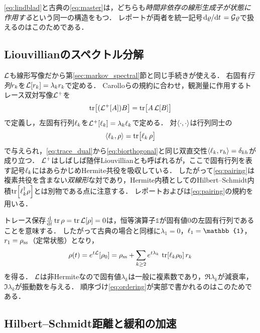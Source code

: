 \documentclass[a4paper,11pt,onecolumn]{jlreq}
\begin{document}
\eqref{eq:lindblad}と古典の\eqref{eq:master}は，どちらも\emph{時間非依存の線形生成子が状態に作用する}という同一の構造をもつ．
レポートが両者を統一記号$\dv*{\varrho}{t}=\mathcal{G}\varrho$で扱えるのはこのためである．

\subsection{Liouvillianのスペクトル分解}
\label{sec:lindblad_spectral}

$\mathcal{L}$も線形写像だから第\ref{sec:markov_spectral}節と同じ手続きが使える．
右固有\emph{行列}$r_{k}$を$\mathcal{L}[r_{k}]=\lambda_kr_{k}$で定める．
Carolloらの規約に合わせ，観測量に作用するトレース双対写像$\mathcal{L}^{+}$を
\begin{equation}
  \tr\!\big[(\mathcal{L}^{+}[A])B\big]
  = \tr\!\big[A\,\mathcal{L}[B]\big]
  \label{eq:trace_dual}
\end{equation}
で定義し，左固有行列$\ell_{k}$を$\mathcal{L}^{+}[\ell_{k}]=\lambda_k\ell_{k}$で定める．
対$\langle \cdot , \cdot \rangle$は行列同士の
\begin{equation}
  \langle \ell_{k} , \rho \rangle = \tr\!\big[\ell_{k}\,\rho\big]
  \label{eq:pairing}
\end{equation}
で与えられ，\eqref{eq:trace_dual}から\eqref{eq:biorthogonal}と同じ双直交性$\langle \ell_{k} , r_{h} \rangle=\delta_{kh}$が成り立つ．
$\mathcal{L}^{+}$はしばしば随伴Liouvillianとも呼ばれるが，ここで固有行列を表す記号$\ell_{k}$にはあらかじめHermite共役を吸収している．
したがって\eqref{eq:pairing}は複素共役を含まない\emph{双線形}な対であり，Hermite内積としてのHilbert--Schmidt内積$\tr[\ell_{k}^{\dagger}\rho]$とは別物である点に注意する．
レポートおよび\cite{Carollo2021}は\eqref{eq:pairing}の規約を用いる．

トレース保存$\dv{t}\tr\rho=\tr\mathcal{L}[\rho]=0$は，恒等演算子$\mathbb{1}$が固有値$0$の左固有行列であることを意味する．
したがって古典の場合と同様に$\lambda_1=0$，$\leig{1}=\mathbb{1}$，$r_{1}=\rho_{\mathrm{ss}}$（定常状態）となり，
\begin{equation}
  \rho(t) = e^{t\mathcal{L}}[\rho_0]
  = \rho_{\mathrm{ss}} + \sum_{k\ge2}e^{t\lambda_k}\,\tr[\ell_{k}\rho_0]\,r_{k}
  \label{eq:lindblad_spectral}
\end{equation}
を得る．
$\mathcal{L}$は非Hermiteなので固有値$\lambda_k$は一般に複素数であり，$\Re\lambda_k$が減衰率，$\Im\lambda_k$が振動数を与える．
順序づけ\eqref{eq:ordering}が実部で書かれるのはこのためである．

\subsection{Hilbert--Schmidt距離と緩和の加速}
\label{sec:lindblad_carollo}
\end{document}

